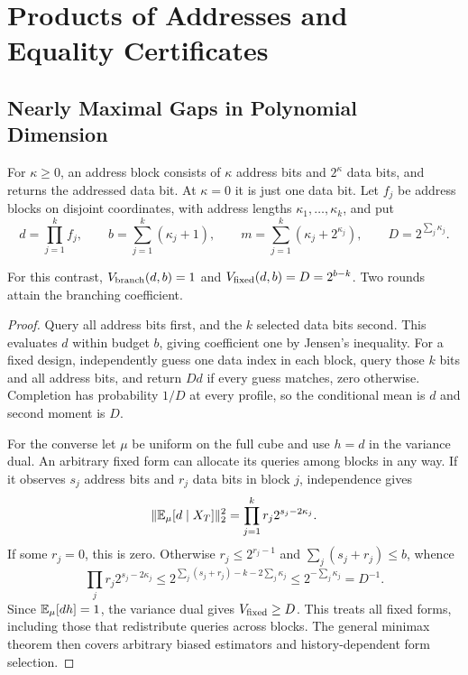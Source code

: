 \section{Products of Addresses and Equality Certificates}\label{app:structure}
\subsection{Nearly Maximal Gaps in Polynomial Dimension}\label{app:productaddress}
For $\kappa\ge0$, an address block consists of $\kappa$ address bits and $2^\kappa$ data bits, and returns the addressed data bit. At $\kappa=0$ it is just one data bit. Let $f_j$ be address blocks on disjoint coordinates, with address lengths $\kappa_1,\ldots,\kappa_k$, and put
\[
 d=\prod_{j=1}^k f_j,\qquad
 b=\sum_{j=1}^k(\kappa_j+1),\qquad
 m=\sum_{j=1}^k(\kappa_j+2^{\kappa_j}),\qquad D=2^{\sum_j \kappa_j}.
\]
\begin{proposition}\label{prop:productaddress}
For this contrast, $V_{\rm branch}(d,b)=1$ and $V_{\rm fixed}(d,b)=D=2^{b-k}$. Two rounds attain the branching coefficient.
\end{proposition}
\begin{proof}
Query all address bits first, and the $k$ selected data bits second. This evaluates $d$ within budget $b$, giving coefficient one by Jensen's inequality. For a fixed design, independently guess one data index in each block, query those $k$ bits and all address bits, and return $D d$ if every guess matches, zero otherwise. Completion has probability $1/D$ at every profile, so the conditional mean is $d$ and second moment is $D$.

For the converse let $\mu$ be uniform on the full cube and use $h=d$ in the variance dual. An arbitrary fixed form can allocate its queries among blocks in any way. If it observes $s_j$ address bits and $r_j$ data bits in block $j$, independence gives
\[
 \|\mathbb{E}_\mu[d\mid X_T]\|_2^2
 =\prod_{j=1}^k r_j2^{s_j-2\kappa_j}.
\]
If some $r_j=0$, this is zero. Otherwise $r_j\le2^{r_j-1}$ and $\sum_j(s_j+r_j)\le b$, whence
\[
 \prod_j r_j2^{s_j-2\kappa_j}
 \le 2^{\sum_j(s_j+r_j)-k-2\sum_j \kappa_j}
 \le 2^{-\sum_j \kappa_j}=D^{-1}.
\]
Since $\mathbb{E}_\mu[dh]=1$, the variance dual gives $V_{\rm fixed}\ge D$. This treats all fixed forms, including those that redistribute queries across blocks. The general minimax theorem then covers arbitrary biased estimators and history-dependent form selection.
\end{proof}

